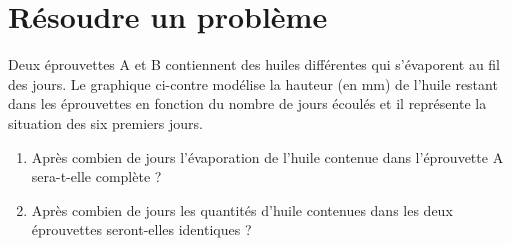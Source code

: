 \documentclass[a4paper, 12pt, parskip=half-]{scrartcl}
\begin{document}



\section*{ Résoudre un problème}
\begin{transferer}[points=4]
    \parbox[c]{.5\linewidth}{Deux éprouvettes A et B contiennent des huiles différentes qui s'évaporent au fil des jours.
        Le graphique ci-contre modélise la hauteur (en mm) de l'huile restant dans les éprouvettes en fonction du nombre de jours écoulés et il représente la situation des six premiers jours.}
    \hfil
    
    \begin{enumerate}
        \item Après combien de jours l'évaporation de l'huile contenue dans l'éprouvette A sera-t-elle complète ?
        \item Après combien de jours les quantités d'huile contenues dans les deux éprouvettes seront-elles identiques ?
    \end{enumerate}
\end{transferer}
\end{document}
